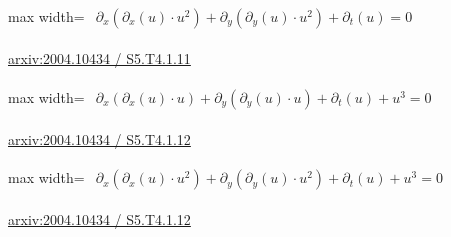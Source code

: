 \documentclass[UTF8,10pt,a4paper,fontset=mac]{ctexart}
\begin{document}
\begin{minipage}{\linewidth}\begin{center}\begin{adjustbox}{max width=\linewidth}$\displaystyle\begin{gathered}\begin{gathered}\partial_{x}(\partial_{x}(u)\cdot u^{2})+\partial_{y}(\partial_{y}(u)\cdot u^{2})+\partial_{t}(u)=0\end{gathered}\end{gathered}$\end{adjustbox}\end{center}{\small\href{https://arxiv.org/html/2004.10434#S5.T4.1.11}{arxiv:2004.10434 / S5.T4.1.11}}\par\end{minipage}\par\vspace{6mm}

\begin{minipage}{\linewidth}\begin{center}\begin{adjustbox}{max width=\linewidth}$\displaystyle\begin{gathered}\begin{gathered}\partial_{x}(\partial_{x}(u)\cdot u)+\partial_{y}(\partial_{y}(u)\cdot u)+\partial_{t}(u)+u^{3}=0\end{gathered}\end{gathered}$\end{adjustbox}\end{center}{\small\href{https://arxiv.org/html/2004.10434#S5.T4.1.12}{arxiv:2004.10434 / S5.T4.1.12}}\par\end{minipage}\par\vspace{6mm}

\begin{minipage}{\linewidth}\begin{center}\begin{adjustbox}{max width=\linewidth}$\displaystyle\begin{gathered}\begin{gathered}\partial_{x}(\partial_{x}(u)\cdot u^{2})+\partial_{y}(\partial_{y}(u)\cdot u^{2})+\partial_{t}(u)+u^{3}=0\end{gathered}\end{gathered}$\end{adjustbox}\end{center}{\small\href{https://arxiv.org/html/2004.10434#S5.T4.1.12}{arxiv:2004.10434 / S5.T4.1.12}}\par\end{minipage}\par\vspace{6mm}
\end{document}
